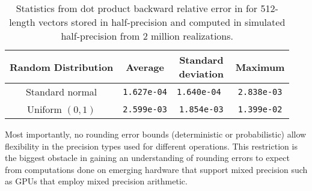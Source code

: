 \begin{table}
	\centering
	\begin{tabular}{||c|c|c|c||} 
		\hline
		Random Distribution & Average & \makecell{Standard\\deviation}& Maximum\\ \hline
		Standard normal &{\tt 1.627e-04} & {\tt 1.640e-04 } & {\tt 2.838e-03}\\ \hline
		Uniform $(0,1)$ & {\tt 2.599e-03}& {\tt 1.854e-03} & {\tt 1.399e-02}\\ \hline
	\end{tabular}
	\caption{Statistics from dot product backward relative error in for 512-length vectors stored in half-precision and computed in simulated half-precision from 2 million realizations.}
	\label{table:HPdoterr}
\end{table}

Most importantly, no rounding error bounds (deterministic or probabilistic) allow flexibility in the precision types used for different operations. 
This restriction is the biggest obstacle in gaining an understanding of rounding errors to expect from computations done on emerging hardware that support mixed precision such as GPUs that employ mixed precision arithmetic.

